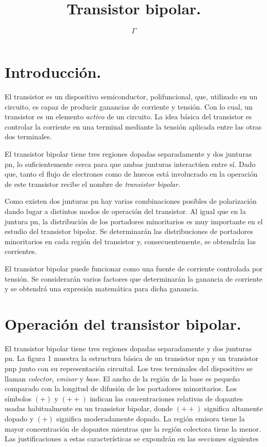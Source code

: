 \documentclass[12pt,a4paper]{article}
\begin{document}
\title{Transistor bipolar.}

\author{$\Gamma$}

\maketitle

\section{Introducción.}

El transistor es un dispositivo semiconductor, polifuncional, que, utilizado en un circuito, es capaz de producir ganancias de corriente y tensión. Con lo cual, un transistor es un elemento \emph{activo} de un circuito. La idea básica del transistor es controlar la corriente en una terminal mediante la tensión aplicada entre las otras dos terminales.

El transistor bipolar tiene tres regiones dopadas separadamente y dos junturas pn, lo suficientemente cerca para que ambas junturas interactúen entre sí. Dado que, tanto el flujo de electrones como de huecos está involucrado en la operación de este transistor recibe el nombre de \emph{transistor bipolar}.

Como existen dos junturas pn hay varias combinaciones posibles de polarización dando lugar a distintos modos de operación del transistor. Al igual que en la juntura pn, la distribución de los portadores minoritarios es muy importante en el estudio del transistor bipolar. Se determinarán las distribuciones de portadores minoritarios en cada región del transistor y, consecuentemente, se obtendrán las corrientes.

El transistor bipolar puede funcionar como una fuente de corriente controlada por tensión. Se considerarán varios factores que determinarán la ganancia de corriente y se obtendrá una expresión matemática para dicha ganancia.

\section{Operación del transistor bipolar.}

El transistor bipolar tiene tres regiones dopadas separadamente y dos junturas pn. La figura 1 muestra la estructura básica de un transistor npn y un transistor pnp junto con su representación circuital. Los tres terminales del dispositivo se llaman \emph{colector}, \emph{emisor} y \emph{base}. El ancho de la región de la base es pequeño comparado con la longitud de difusión de los portadores minoritarios. Los símbolos $(+)$ y $(++)$ indican las concentraciones relativas de dopantes usadas habitualmente en un transistor bipolar, donde $(++)$ significa altamente dopado y $(+)$ significa moderadamente dopado. La región emisora tiene la mayor concentración de dopantes mientras que la región colectora tiene la menor. Las justificaciones a estas características se expondrán en las secciones siguientes
\end{document}
